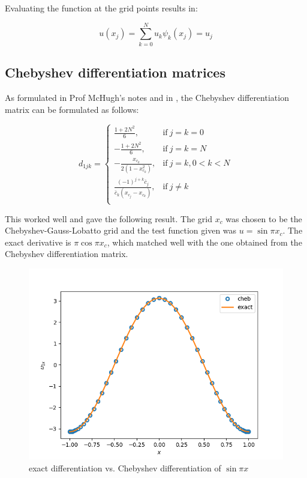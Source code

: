 \documentclass{article}
\begin{document}
Evaluating the function at the grid points results in:

\begin{equation*}
 u(x_{j}) = \sum_{k=0}^{N} u_{k}\psi_{k}(x_{j}) = u_{j}
\end{equation*}

\subsection{Chebyshev differentiation matrices}
As formulated in Prof McHugh's notes and in \cite{trefethen2000spectral}, the Chebyshev differentiation matrix can be formulated as follows:

\begin{equation}
 d_{1jk} = \begin{cases}
      \frac{1+2N^{2}}{6}, & \text{if}\ j = k = 0 \\
      -\frac{1+2N^{2}}{6}, & \text{if}\ j = k = N\\
      -\frac{x_{c_{k}}}{2(1-x_{c_{k}}^{2})}, & \text{if}\ j = k, 0 < k < N \\
      \frac{(-1)^{j+k}\bar{c}_{j} }{\bar{c}_{k}(x_{c_{j}} - x_{c_{k}})}, & \text{if}\ j \neq k \\
    \end{cases}
\end{equation}

This worked well and gave the following result. The grid $x_{c}$ was chosen to be the Chebyshev-Gauss-Lobatto grid and the test function given was $u = \sin{\pi x_{c}}$. The exact derivative is $\pi \cos{\pi x_{c}}$, which matched well with the one obtained from the Chebyshev differentiation matrix.   
  \begin{figure}[H]
        \centering
        \includegraphics[scale = 0.6]{Figs/test_cheb.png}
            \caption{exact differentiation vs. Chebyshev differentiation of $\sin{\pi x}$}
        \label{fig:test_interpolate_1_c2f}
\end{figure}
\end{document}
